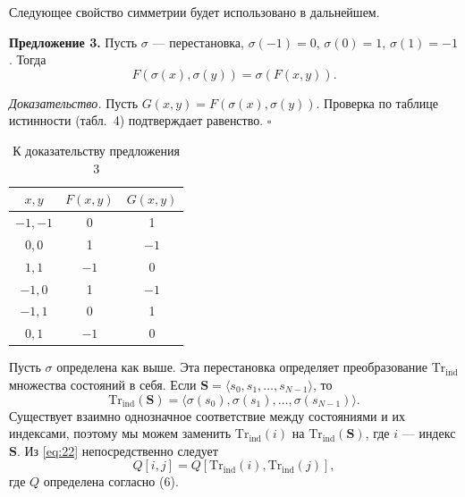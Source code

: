 \documentclass[a4paper,12pt]{article}
\begin{document}
Следующее свойство симметрии будет использовано в дальнейшем.

\textbf{Предложение 3.} Пусть $\sigma$ — перестановка, $\sigma(-1)=0$, $\sigma(0)=1$, $\sigma(1)=-1$. Тогда
\begin{equation}
F(\sigma(x),\sigma(y)) = \sigma(F(x,y)).
\label{eq:22}
\end{equation}

\textit{Доказательство.} Пусть $G(x,y)=F(\sigma(x),\sigma(y))$. Проверка по таблице истинности (табл.~4) подтверждает равенство. $\square$

\begin{table}[h]
\centering
\caption{К доказательству предложения 3}
\label{tab:4}
\begin{tabular}{c|c|c}
$x,y$ & $F(x,y)$ & $G(x,y)$ \\ \hline
$-1,-1$ & 0 & 1 \\
$0,0$   & 1 & $-1$ \\
$1,1$   & $-1$ & 0 \\
$-1,0$  & 1 & $-1$ \\
$-1,1$  & 0 & 1 \\
$0,1$   & $-1$ & 0
\end{tabular}
\end{table}

Пусть $\sigma$ определена как выше. Эта перестановка определяет преобразование $\mathrm{Tr}_{\mathrm{ind}}$ множества состояний в себя. Если $\mathbf{S}=\langle s_0,s_1,\ldots,s_{N-1}\rangle$, то
\begin{equation}
\mathrm{Tr}_{\mathrm{ind}}(\mathbf{S}) = \langle \sigma(s_0), \sigma(s_1), \ldots, \sigma(s_{N-1})\rangle.
\label{eq:23}
\end{equation}
Существует взаимно однозначное соответствие между состояниями и их индексами, поэтому мы можем заменить $\mathrm{Tr}_{\mathrm{ind}}(i)$ на $\mathrm{Tr}_{\mathrm{ind}}(\mathbf{S})$, где $i$ — индекс $\mathbf{S}$. Из \eqref{eq:22} непосредственно следует
\begin{equation}
Q[i,j] = Q[\mathrm{Tr}_{\mathrm{ind}}(i), \mathrm{Tr}_{\mathrm{ind}}(j)],
\label{eq:24}
\end{equation}
где $Q$ определена согласно (6).
\end{document}
